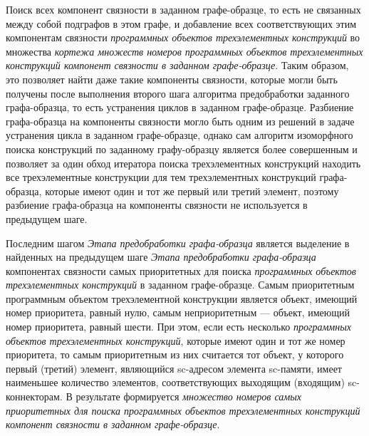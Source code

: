 \begin{textitemize}
	\item Поиск всех компонент связности в заданном графе-образце, то есть не связанных между собой подграфов в этом графе, и добавление всех соответствующих этим компонентам связности \textit{программных объектов трехэлементных конструкций} во множества \textit{кортежа множеств номеров программных объектов трехэлементных конструкций компонент связности в заданном графе-образце}. Таким образом, это позволяет найти даже такие компоненты связности, которые могли быть получены после выполнения второго шага алгоритма предобработки заданного графа-образца, то есть устранения циклов в заданном графе-образце. Разбиение графа-образца на компоненты связности могло быть одним из решений в задаче устранения цикла в заданном графе-образце, однако сам алгоритм изоморфного поиска конструкций по заданному графу-образцу является более совершенным и позволяет за один обход итератора поиска трехэлементных конструкций находить все трехэлементные конструкции для тем трехэлементных конструкций графа-образца, которые имеют один и тот же первый или третий элемент, поэтому разбиение графа-образца на компоненты связности не используется в предыдущем шаге.
	\item Последним шагом \textit{Этапа предобработки графа-образца} является выделение в найденных на предыдущем шаге \textit{Этапа предобработки графа-образца} компонентах связности самых приоритетных для поиска \textit{программных объектов трехэлементных конструкций} в заданном графе-образце. Самым приоритетным программным объектом трехэлементной конструкции является объект, имеющий номер приоритета, равный нулю, самым неприоритетным --- объект, имеющий номер приоритета, равный шести. При этом, если есть несколько \textit{программных объектов трехэлементных конструкций}, которые имеют один и тот же номер приоритета, то самым приоритетным из них считается тот объект, у которого первый (третий) элемент, являющийся sc-адресом элемента sc-памяти, имеет наименьшее количество элементов, соответствующих выходящим (входящим) sc-коннекторам. В результате формируется \textit{множество номеров самых приоритетных для поиска программных объектов трехэлементных конструкций компонент связности в заданном графе-образце}.
\end{textitemize}

